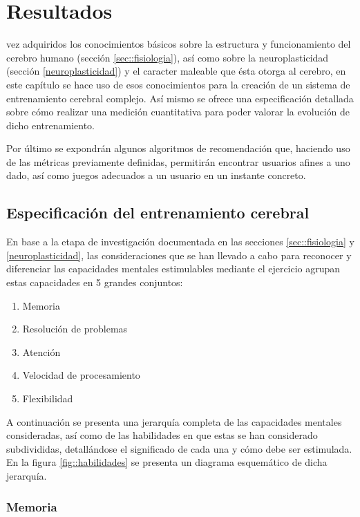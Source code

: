 \chapter{Resultados}
\label{chap:resultados}

 vez adquiridos los conocimientos básicos sobre la estructura y funcionamiento del cerebro humano (sección \ref{sec::fisiologia}), así como sobre la neuroplasticidad (sección \ref{neuroplasticidad}) y el caracter maleable que ésta otorga al cerebro, en este capítulo se hace uso de esos conocimientos para la creación de un sistema de entrenamiento cerebral complejo. Así mismo se ofrece una especificación detallada sobre cómo realizar una medición cuantitativa para poder valorar la evolución de dicho entrenamiento.

Por último se expondrán algunos algoritmos de recomendación que, haciendo uso de las métricas previamente definidas, permitirán encontrar usuarios afines a uno dado, así como juegos adecuados a un usuario en un instante concreto.

\section{Especificación del entrenamiento cerebral}
\label{sec:entrenamiento}
En base a la etapa de investigación documentada en las secciones \ref{sec::fisiologia} y \ref{neuroplasticidad}, las consideraciones que se han llevado a cabo para reconocer y diferenciar las capacidades mentales estimulables mediante el ejercicio agrupan estas capacidades en 5 grandes conjuntos:

\renewcommand{\labelenumi}{\bf\arabic{enumi}. }
\begin{enumerate}
\item Memoria
\item Resolución de problemas
\item Atención
\item Velocidad de procesamiento
\item Flexibilidad
\end{enumerate}

A continuación se presenta una jerarquía completa de las capacidades mentales consideradas, así como de las habilidades en que estas se han considerado subdivididas, detallándose el significado de cada una y cómo debe ser estimulada. En la figura \ref{fig::habilidades} se presenta un diagrama esquemático de dicha jerarquía.

\subsection{Memoria}

